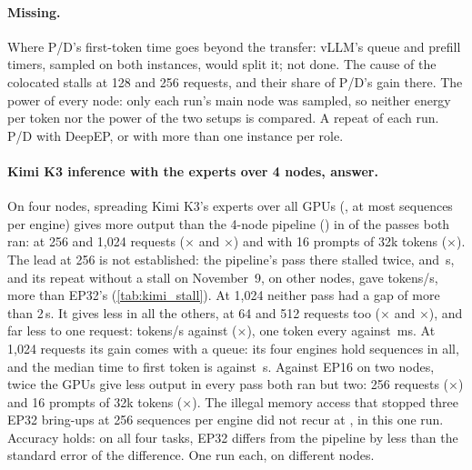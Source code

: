 \paragraph{Missing.} Where P/D's first-token time goes beyond the transfer: vLLM's queue and prefill timers, sampled on both instances, would split it; not done. The cause of the colocated stalls at 128 and 256 requests, and their share of P/D's gain there. The power of every node: only each run's main node was sampled, so neither energy per token nor the power of the two setups is compared. A repeat of each run. P/D with DeepEP, or with more than one instance per role.

\paragraph{Kimi K3 inference with the experts over 4 nodes, answer.} On four nodes, spreading Kimi K3's experts over all \TriKxnFourGpus{} GPUs (\TriKxnFourLayout, at most \TriKxnFourMaxSeqs{} sequences per engine) gives more output than the 4-node pipeline (\TriKimiFourLayout) in \TriKxnFourLeadN{} of the \TriKxnFourCommon{} passes both ran: at 256 and 1,024 requests (\TriKxnFourTwoFiftySixRatio$\times$ and \TriKxnFourTopRatio$\times$) and with 16 prompts of 32k tokens (\TriKxnFourCtxThirtyTwoSixteenRatio$\times$). The lead at 256 is not established: the pipeline's pass there stalled twice, \TriKstallFourTwoFiftySixStall{} and \TriKstallFourTwoFiftySixStallSecond\,s, and its repeat without a stall on November~9, on other nodes, gave \TriKstallTwoFiftySixRepeat{} tokens/s, more than EP32's \TriKxnFourTwoFiftySixTok{} (\cref{tab:kimi_stall}). At 1,024 neither pass had a gap of more than 2\,s. It gives less in all the others, at 64 and 512 requests too (\TriKxnFourSixtyFourRatio$\times$ and \TriKxnFourFiveTwelveRatio$\times$), and far less to one request: \TriKxnFourOneTok{} tokens/s against \TriKimiFourOneTok{} (\TriKxnFourOneRatio$\times$), one token every \TriKxnFourOneTpot{} against \TriKimiFourOneTpot\,ms. At 1,024 requests its gain comes with a queue: its four engines hold \TriKxnFourHeld{} sequences in all, and the median time to first token is \TriKxnFourTopTtft{} against \TriKxnFourTopTtftPp\,s. Against EP16 on two nodes, twice the GPUs give less output in every pass both ran but two: 256 requests (\TriKxnFourEpTwoFiftySixRatio$\times$) and 16 prompts of 32k tokens (\TriKxnFourEpCtxThirtyTwoSixteenRatio$\times$). The illegal memory access that stopped three EP32 bring-ups at 256 sequences per engine did not recur at \TriKxnFourMaxSeqs, in this one run. Accuracy holds: on all four tasks, EP32 differs from the pipeline by less than the standard error of the difference. One run each, on different nodes.

